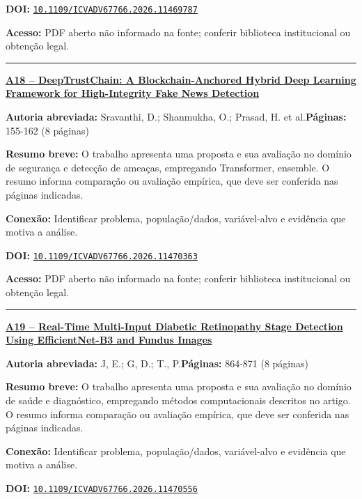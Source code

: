 \documentclass[10pt,a4paper]{article}
\begin{document}
\textbf{DOI:} \href{https://doi.org/10.1109/ICVADV67766.2026.11469787}{\nolinkurl{10.1109/ICVADV67766.2026.11469787}}\par
\textbf{Acesso:} PDF aberto não informado na fonte; conferir biblioteca institucional ou obtenção legal.\par
\noindent\rule{\textwidth}{0.35pt}
\par\medskip\noindent
{\large\bfseries\href{https://doi.org/10.1109/ICVADV67766.2026.11470363}{A18 -- DeepTrustChain: A Blockchain-Anchored Hybrid Deep Learning Framework for High-Integrity Fake News Detection}}\par\smallskip
\textbf{Autoria abreviada:} Sravanthi, D.; Shanmukha, O.; Prasad, H. et al.\quad \textbf{Páginas:} 155-162 (8 páginas)\par
\textbf{Resumo breve:} O trabalho apresenta uma proposta e sua avaliação no domínio de segurança e detecção de ameaças, empregando Transformer, ensemble. O resumo informa comparação ou avaliação empírica, que deve ser conferida nas páginas indicadas.\par
\textbf{Conexão:} Identificar problema, população/dados, variável-alvo e evidência que motiva a análise.\par
\textbf{DOI:} \href{https://doi.org/10.1109/ICVADV67766.2026.11470363}{\nolinkurl{10.1109/ICVADV67766.2026.11470363}}\par
\textbf{Acesso:} PDF aberto não informado na fonte; conferir biblioteca institucional ou obtenção legal.\par
\noindent\rule{\textwidth}{0.35pt}
\par\medskip\noindent
{\large\bfseries\href{https://doi.org/10.1109/ICVADV67766.2026.11470556}{A19 -- Real-Time Multi-Input Diabetic Retinopathy Stage Detection Using EfficientNet-B3 and Fundus Images}}\par\smallskip
\textbf{Autoria abreviada:} J, E.; G, D.; T., P.\quad \textbf{Páginas:} 864-871 (8 páginas)\par
\textbf{Resumo breve:} O trabalho apresenta uma proposta e sua avaliação no domínio de saúde e diagnóstico, empregando métodos computacionais descritos no artigo. O resumo informa comparação ou avaliação empírica, que deve ser conferida nas páginas indicadas.\par
\textbf{Conexão:} Identificar problema, população/dados, variável-alvo e evidência que motiva a análise.\par
\textbf{DOI:} \href{https://doi.org/10.1109/ICVADV67766.2026.11470556}{\nolinkurl{10.1109/ICVADV67766.2026.11470556}}\par
\end{document}
